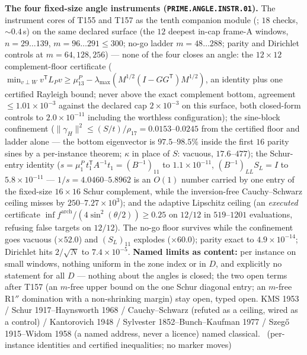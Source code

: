 \documentclass[11pt,a4paper]{article}
\theoremstyle{definition}
\begin{document}
\par\smallskip\noindent\textbf{The four fixed-size angle instruments
(\texttt{PRIME.ANGLE.INSTR.01}).}
The instrument cores of T155 and T157 as the tenth companion module
(; $18$ checks, ${\sim}0.4$\,s) on the
same declared surface (the $12$ deepest in-cap frame-A windows,
$n=29\ldots139$, $m=96\ldots291\le300$; no-go ladder $m=48\ldots288$;
parity and Dirichlet controls at $m=64,128,256$) --- none of the four
closes an angle: the $12\times12$ complement-floor certificate
($\min_{v\perp W}v^{\mathsf T}L_Pv\ge\mu^P_{13}-\lambda_{\max}(M^{1/2}
(I-GG^{\mathsf T})M^{1/2})$, an identity plus one certified Rayleigh
bound; never above the exact complement bottom, agreement
$\le1.01\times10^{-3}$ against the declared cap $2\times10^{-3}$ on this
surface, both closed-form controls to $2.0\times10^{-11}$ including the
worthless configuration); the sine-block confinement
($\|\gamma_H\|^2\le(S/t)/\rho_{17}=0.0153$--$0.0245$ from the certified
floor and ladder alone --- the bottom eigenvector is $97.5$--$98.5\%$
inside the first $16$ parity sines by a per-instance theorem; $\kappa$
in place of $S$: vacuous, $17.6$--$477$); the Schur-entry identity
($s=\mu^P_1\,t_1^{\mathsf T}A^{-1}t_1=(B^{-1})_{11}$ to
$1.1\times10^{-11}$, $(B^{-1})_{LL}S_L=I$ to $5.8\times10^{-11}$ ---
$1/s=4.0460$--$5.8962$ is an $O(1)$ number carried by one entry of the
fixed-size $16\times16$ Schur complement, while the inversion-free
Cauchy--Schwarz ceiling misses by $250$--$7.27\times10^{3}$); and the
adaptive Lipschitz ceiling (an \emph{executed} certificate
$\inf f^{\mathrm{arch}}/(4\sin^2(\theta/2))\ge0.25$ on $12/12$ in
$519$--$1201$ evaluations, refusing false targets on $12/12$). The no-go
floor survives while the confinement goes vacuous ($\times52.0$) and
$(S_L)_{11}$ explodes ($\times60.0$); parity exact to
$4.9\times10^{-14}$; Dirichlet hits $2/\sqrt N$ to $7.4\times10^{-5}$.
\textbf{Named limits as content:} per instance on small windows, nothing
uniform in the zone index or in $D$, and explicitly no statement for all
$D$ --- nothing about the angles is closed; the two open terms after
T157 (an $m$-free upper bound on the one Schur diagonal entry; an
$m$-free R1$''$ domination with a non-shrinking margin) stay open, typed
open. KMS 1953 / Schur 1917--Haynsworth 1968 / Cauchy--Schwarz (refuted
as a ceiling, wired as a control) / Kantorovich 1948 / Sylvester
1852--Bunch--Kaufman 1977 / Szeg\H{o} 1915--Widom 1958 (a named address,
never a licence) named classical.
\mE\ (per-instance identities and certified inequalities; no marker moves)
\par\smallskip
\end{document}
